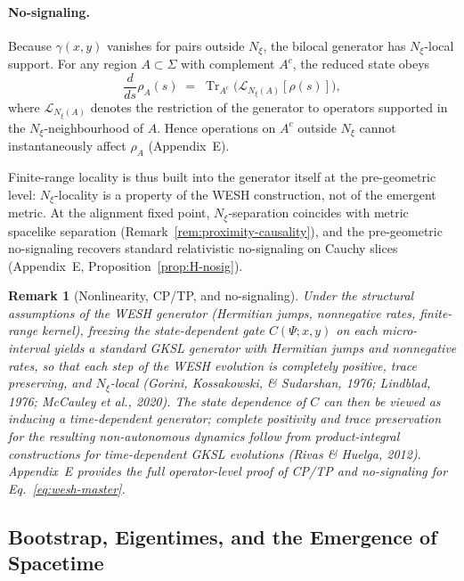 \documentclass[12pt,a4paper]{article}
\newtheorem{remark}{Remark}[section]
\renewcommand{\Tr}{\operatorname{Tr}}
\numberwithin{equation}{section}
\begin{document}
\paragraph{No-signaling.}
Because $\gamma(x,y)$ vanishes for pairs outside $N_\xi$, the bilocal generator has
$N_\xi$-local support. For any region $A\subset\Sigma$ with complement $A^c$,
the reduced state obeys
\begin{equation}
\frac{d}{ds}\rho_A(s)\;=\;\Tr_{A^c}\big(\mathcal L_{N_\xi(A)}[\rho(s)]\big),
\label{eq:no-signaling}
\end{equation}
where $\mathcal L_{N_\xi(A)}$ denotes the restriction of the generator to operators
supported in the $N_\xi$-neighbourhood of $A$. Hence operations on $A^c$ outside $N_\xi$
cannot instantaneously affect $\rho_A$ (Appendix~E).

 \noindent Finite-range locality is thus built into the generator itself at the pre-geometric level: $N_\xi$-locality is a property of the WESH construction, not of the emergent metric. At the 
alignment fixed point, $N_\xi$-separation coincides with metric spacelike separation
(Remark~\ref{rem:proximity-causality}), and the pre-geometric no-signaling recovers
standard relativistic no-signaling on Cauchy slices (Appendix~E, Proposition~\ref{prop:H-nosig}).

\begin{remark}[Nonlinearity, CP/TP, and no-signaling]
\label{rem:nonlinear-cp}
Under the structural assumptions of the WESH generator (Hermitian jumps, nonneg\-ative rates, finite-range kernel), freezing the state-dependent
gate $C(\Psi;x,y)$ on each micro-interval yields a standard GKSL generator
with Hermitian jumps and nonnegative rates, so that each step of the WESH
evolution is completely positive, trace preserving, and $N_\xi$-local (Gorini, Kossakowski, \& Sudarshan, 1976; Lindblad, 1976; McCauley
et al., 2020). The state dependence of $C$ can then be viewed as inducing a
time-dependent generator; complete positivity and trace preservation for the
resulting non-autonomous dynamics follow from product-integral constructions
for time-dependent GKSL evolutions (Rivas \& Huelga, 2012). Appendix~E
provides the full operator-level proof of CP/TP and no-signaling for
Eq.~\eqref{eq:wesh-master}.
\end{remark}

\subsection{Bootstrap, Eigentimes, and the Emergence of Spacetime}
\label{sec:eigentime-bootstrap}
\end{document}
